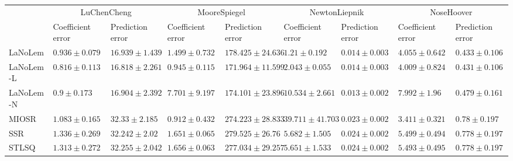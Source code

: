 \begin{table*}
{\begin{tabular}{lllllllll}
 & \multicolumn{2}{c}{LuChenCheng} & \multicolumn{2}{c}{MooreSpiegel} & \multicolumn{2}{c}{NewtonLiepnik} & \multicolumn{2}{c}{NoseHoover} \\
 & Coefficient error & Prediction error & Coefficient error & Prediction error & Coefficient error & Prediction error & Coefficient error & Prediction error \\
\midrule
LaNoLem & $0.936\pm 0.079$ & $16.939\pm 1.439$ & $1.499\pm 0.732$ & $178.425\pm 24.636$ & $\mathbf{1.21}\pm 0.192$ & $0.014\pm 0.003$ & $4.055\pm 0.642$ & $0.433\pm 0.106$ \\
LaNoLem-L & $\mathbf{0.816}\pm 0.113$ & $\mathbf{16.818}\pm 2.261$ & $0.945\pm 0.115$ & $\mathbf{171.964}\pm 11.599$ & $2.043\pm 0.055$ & $0.014\pm 0.003$ & $4.009\pm 0.824$ & $\mathbf{0.431}\pm 0.106$ \\
LaNoLem-N & $0.9\pm 0.173$ & $16.904\pm 2.392$ & $7.701\pm 9.197$ & $174.101\pm 23.896$ & $10.534\pm 2.661$ & $\mathbf{0.013}\pm 0.002$ & $7.992\pm 1.96$ & $0.479\pm 0.161$ \\
MIOSR & $1.083\pm 0.165$ & $32.33\pm 2.185$ & $\mathbf{0.912}\pm 0.432$ & $274.223\pm 28.833$ & $39.711\pm 41.703$ & $0.023\pm 0.002$ & $\mathbf{3.411}\pm 0.321$ & $0.78\pm 0.197$ \\
SSR & $1.336\pm 0.269$ & $32.242\pm 2.02$ & $1.651\pm 0.065$ & $279.525\pm 26.76$ & $5.682\pm 1.505$ & $0.024\pm 0.002$ & $5.499\pm 0.494$ & $0.778\pm 0.197$ \\
STLSQ & $1.313\pm 0.272$ & $32.255\pm 2.042$ & $1.656\pm 0.063$ & $277.034\pm 29.257$ & $5.651\pm 1.533$ & $0.024\pm 0.002$ & $5.493\pm 0.495$ & $0.778\pm 0.197$ \\

\bottomrule
\end{tabular}
}
\end{table*}
